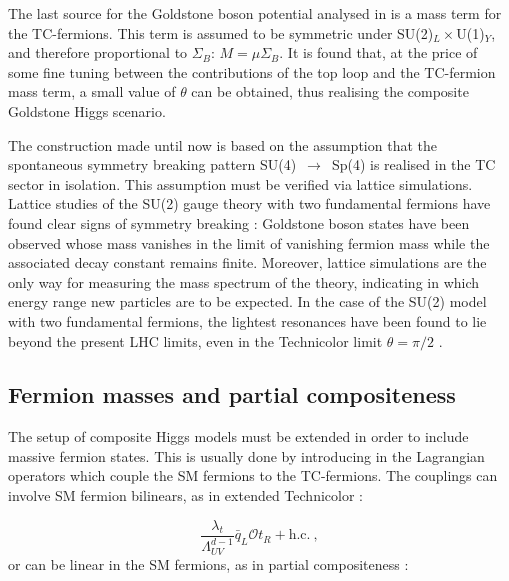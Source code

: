 The last source for the Goldstone boson potential analysed in \cite{Cacciapaglia:2014uja} is a mass term for the TC-fermions. This term is assumed to be symmetric under SU(2)$_L \times$U(1)$_Y$, and therefore proportional to $\Sigma_B$: $M = \mu \Sigma_B$. It is found that, at the price of some fine tuning between the contributions of the top loop and the TC-fermion mass term, a small value of $\theta$ can be obtained, thus realising the composite Goldstone Higgs scenario.

The construction made until now is based on the assumption that the spontaneous symmetry breaking pattern SU(4)~$\to$~Sp(4)  is realised in the TC sector in isolation. This assumption must be verified via lattice simulations. Lattice studies of the SU(2) gauge theory with two fundamental fermions have found clear signs of symmetry breaking \cite{Arthur:2016dir}: Goldstone boson states have been observed whose mass vanishes in the limit of vanishing fermion mass while the associated decay constant remains finite. Moreover, lattice simulations are the only way for measuring the mass spectrum of the theory, indicating in which energy range new particles are to be expected. In the case of the SU(2) model with two fundamental fermions, the lightest resonances have been found to lie beyond the present LHC limits, even in the Technicolor limit $\theta = \pi/2$ \cite{Arthur:2016dir}.


\subsection{Fermion masses and partial compositeness}
\label{partial_comp}

The setup of composite Higgs models must be extended in order to include massive fermion states. This is usually done by introducing in the Lagrangian operators which couple the SM fermions to the TC-fermions. The couplings can involve SM fermion bilinears, as in extended Technicolor \cite{Dimopoulos:1979es,Eichten:1979ah}:

\begin{equation}
\frac{\lambda_t}{\Lambda_{UV}^{d-1}} \bar q_L \mathcal O t_R + \mathrm{h.c.} \: ,
\label{ETC}
\end{equation}
%
or can be linear in the SM fermions, as in partial compositeness \cite{Kaplan:1991dc}:

